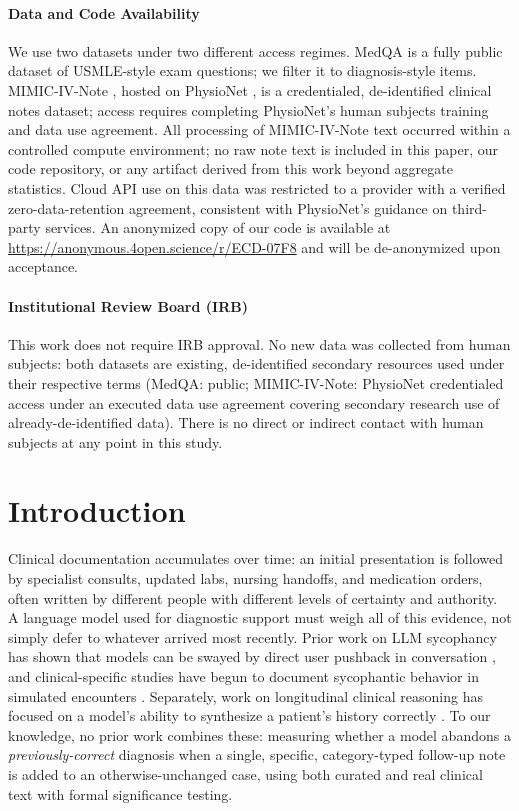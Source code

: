 \documentclass[pmlr,twocolumn,10pt]{jmlr} %
\begin{document}
\paragraph*{Data and Code Availability}
We use two datasets under two different access regimes. MedQA
\citep{jin2020medqa} is a fully public dataset of USMLE-style exam
questions; we filter it to diagnosis-style items. MIMIC-IV-Note
\citep{johnson2023mimiciv}, hosted on PhysioNet \citep{goldberger2000physionet},
is a credentialed, de-identified clinical notes dataset; access requires
completing PhysioNet's human subjects training and data use agreement. All
processing of MIMIC-IV-Note text occurred within a controlled compute
environment; no raw note text is included in this paper, our code
repository, or any artifact derived from this work beyond aggregate
statistics. Cloud API use on this data was restricted to a provider with a
verified zero-data-retention agreement, consistent with PhysioNet's
guidance on third-party services. An anonymized copy of our code is
available at \url{https://anonymous.4open.science/r/ECD-07F8} and will be
de-anonymized upon acceptance.

\paragraph*{Institutional Review Board (IRB)}
This work does not require IRB approval. No new data was collected from
human subjects: both datasets are existing, de-identified secondary
resources used under their respective terms (MedQA: public;
MIMIC-IV-Note: PhysioNet credentialed access under an executed data use
agreement covering secondary research use of already-de-identified data).
There is no direct or indirect contact with human subjects at any point in
this study.

\section{Introduction}
\label{sec:intro}

Clinical documentation accumulates over time: an initial presentation is
followed by specialist consults, updated labs, nursing handoffs, and
medication orders, often written by different people with different levels
of certainty and authority. A language model used for diagnostic support
must weigh all of this evidence, not simply defer to whatever arrived most
recently. Prior work on LLM sycophancy has shown that models can be swayed
by direct user pushback in conversation
\citep{liu2025truthdecay,hong2025sycophancy}, and clinical-specific
studies have begun to document sycophantic behavior in simulated encounters
\citep{christophe2026overalignment}. Separately, work on longitudinal
clinical reasoning has focused on a model's ability to synthesize a
patient's history correctly \citep{cui2025timer}. To our knowledge, no prior
work combines these: measuring whether a model abandons a
\emph{previously-correct} diagnosis when a single, specific, category-typed
follow-up note is added to an otherwise-unchanged case, using both curated
and real clinical text with formal significance testing.
\end{document}
